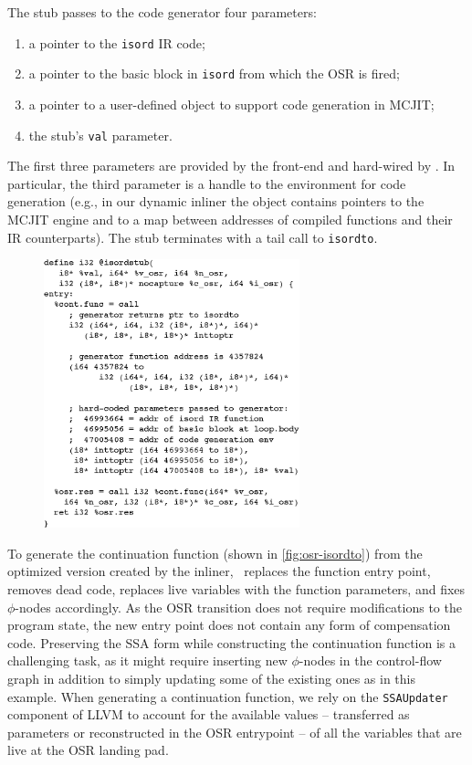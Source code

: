 \noindent The stub passes to the code generator four parameters:
\begin{enumerate}[parsep=0pt,itemsep=3pt]
 \item a pointer to the {\tt isord} IR code;
 \item a pointer to the basic block in {\tt isord} from which the OSR is fired;
 \item a pointer to a user-defined object to support code generation in MCJIT;
 \item the stub's {\tt val} parameter.
\end{enumerate}

\noindent The first three parameters are provided by the front-end and hard-wired by \osrkit. In particular, the third parameter is a handle to the environment for code generation (e.g., in our dynamic inliner the object contains pointers to the MCJIT engine and to a map between addresses of compiled functions and their IR counterparts). The stub terminates with a tail call to {\tt isordto}.

\ifdefined\noauthorea
\begin{figure}[ht]
\begin{center}
\includegraphics[width=0.66\textwidth]{figures/osr-isordstub/osr-isordstub.eps}
\caption{\protect}
\end{center}
\end{figure}
\fi

\noindent To generate the continuation function (shown in \myfigure\ref{fig:osr-isordto}) from the optimized version created by the inliner, \osrkit\ replaces the function entry point, removes dead code, replaces live variables with the function parameters, and fixes $\phi$-nodes accordingly. As the OSR transition does not require modifications to the program state, the new entry point does not contain any form of compensation code. Preserving the SSA form while constructing the continuation function is a challenging task, as it might require inserting new $\phi$-nodes in the control-flow graph in addition to simply updating some of the existing ones as in this example. When generating a continuation function, we rely on the {\tt SSAUpdater} component of LLVM to account for the available values -- transferred as parameters or reconstructed in the OSR entrypoint -- of all the variables that are live at the OSR landing pad.

